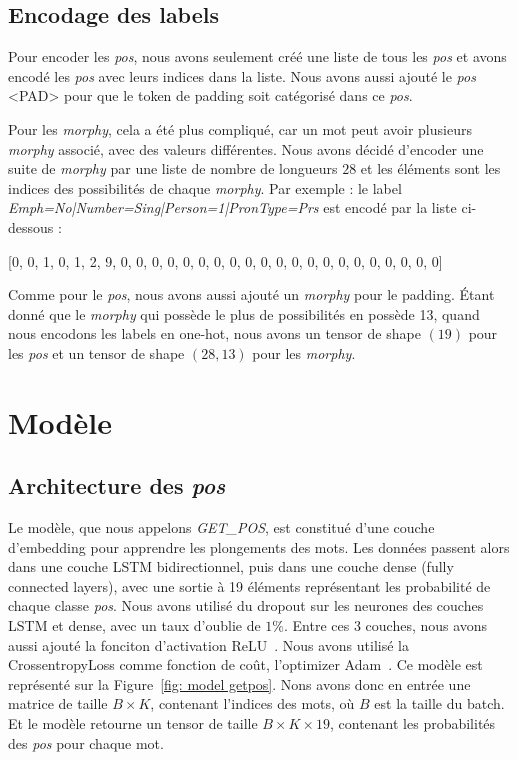\documentclass[a4paper]{article}
\begin{document}
\subsection{Encodage des labels}

Pour encoder les \textit{pos}, nous avons seulement créé une liste de tous les \textit{pos} et avons encodé les \textit{pos} avec leurs indices dans la liste.
Nous avons aussi ajouté le \textit{pos} <PAD> pour que le token de padding soit catégorisé dans ce \textit{pos}.


Pour les \textit{morphy}, cela a été plus compliqué, car un mot peut avoir plusieurs \textit{morphy} associé, avec des valeurs différentes. Nous avons 
décidé d'encoder une suite de \textit{morphy} par une liste de nombre de longueurs $28$ et les éléments sont les indices des possibilités de chaque
\textit{morphy}. Par exemple : le label \textit{Emph=No|Number=Sing|Person=1|PronType=Prs} est encodé par la liste ci-dessous :

[0, 0, 1, 0, 1, 2, 9, 0, 0, 0, 0, 0, 0, 0, 0, 0, 0, 0, 0, 0, 0, 0, 0, 0, 0, 0, 0, 0]

Comme pour le \textit{pos}, nous avons aussi ajouté un \textit{morphy} pour le padding. Étant donné que le \textit{morphy} qui possède
le plus de possibilités en possède 13, quand nous encodons les labels en one-hot, nous avons un tensor de shape
$(19)$ pour les \textit{pos} et un tensor de shape $(28, 13)$ pour les \textit{morphy}.


\section{Modèle}

\subsection{Architecture des \textit{pos}}

Le modèle, que nous appelons \textit{GET\_POS}, est constitué d'une couche d'embedding pour apprendre les plongements
des mots. Les données passent alors dans une couche LSTM bidirectionnel, puis dans une couche dense (fully connected layers),
avec une sortie à 19 éléments représentant les probabilité de chaque classe \textit{pos}. Nous avons utilisé du 
dropout sur les neurones des couches LSTM et dense, avec un taux d'oublie de $1\%$. Entre ces 3 couches, nous avons 
aussi ajouté la fonciton d'activation ReLU~\cite{DBLP:journals/corr/abs-1803-08375}. Nous avons utilisé la CrossentropyLoss 
comme fonction de coût, l'optimizer Adam~\cite{kingma2014adam}. Ce modèle est représenté sur la Figure~\ref{fig: model getpos}.
Nons avons donc en entrée une matrice de taille $B \times K$, contenant l'indices des mots, où $B$ est la taille du batch.
 Et le modèle retourne un tensor de taille $B \times K \times 19$, contenant les probabilités des \textit{pos} pour chaque mot.
\end{document}
